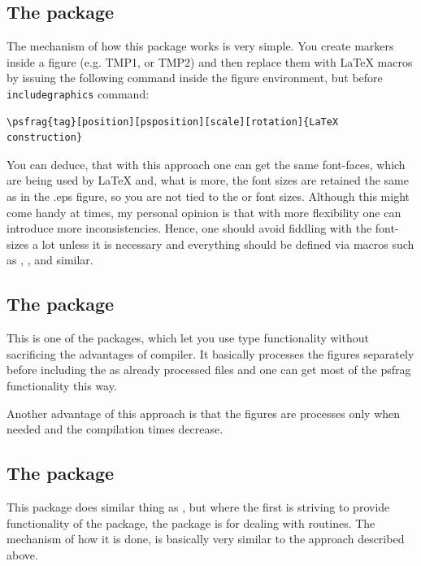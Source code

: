 \documentclass[
]{scrartcl}
\begin{document}

%
\subsection{The  package}

%
The mechanism of how this package works is very simple.
%
You create markers inside a  figure (e.g. TMP1, or TMP2) and then
    replace them with \LaTeX{} macros by issuing the following command inside
    the figure environment, but before \verb|includegraphics| command:
%
\begin{lstlisting}
\psfrag{tag}[position][psposition][scale][rotation]{LaTeX construction}
\end{lstlisting}

%
You can deduce, that with this approach one can get the same font-faces, which
    are being used by \LaTeX{} and, what is more, the font sizes are retained
    the same as in the .eps figure, so you are not tied to the 
    or  font sizes.
%
Although this might come handy at times, my personal opinion is that with more
    flexibility one can introduce more inconsistencies.
%
Hence, one should avoid fiddling with the font-sizes a lot unless it is
    necessary and everything should be defined via macros such as
    , ,  and similar.

%
\subsection{The  package}

%
This is one of the packages, which let you use  type functionality
    without sacrificing the advantages of  compiler.
%
It basically processes the figures separately before including the as already
    processed  files and one can get most of the psfrag functionality
    this way.

%
Another advantage of this approach is that the figures are processes only when
    needed and the compilation times decrease.

%
\subsection{The  package}

%
This package does similar thing as , but where the first is striving
    to provide functionality of the  package, the 
    package is for dealing with  routines.
%
The mechanism of how it is done, is basically very similar to the approach
    described above.


\end{document}
